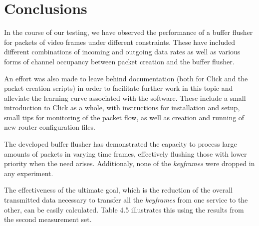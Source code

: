 \clearpage

\chapter{Conclusions}

In the course of our testing, we have observed the performance of a buffer flusher for packets of video frames under different constraints. These have included different combinations of incoming and outgoing data rates as well as various forms of channel occupancy between packet creation and the buffer flusher. 

An effort was also made to leave behind documentation (both for Click and the packet creation scripts) in order to facilitate further work in this topic and alleviate the learning curve associated with the software. These include a small introduction to Click as a whole, with instructions for installation and setup, small tips for monitoring of the packet flow, as well as creation and running of new router configuration files.

The developed buffer flusher has demonstrated the capacity to process large amounts of packets in varying time frames, effectively flushing those with lower priority when the need arises. Additionaly, none of the \textit{keyframes} were dropped in any experiment. 

The effectiveness of the ultimate goal, which is the reduction of the overall transmitted data necessary to transfer all the \textit{keyframes} from one service to the other, can be easily calculated. Table 4.5 illustrates this using the results from the second measurement set.

